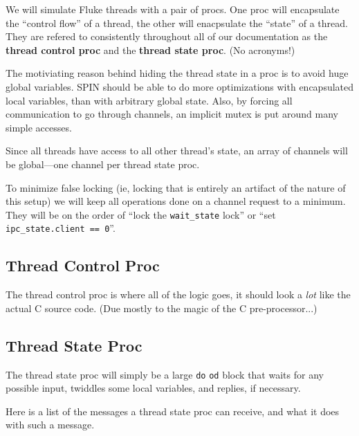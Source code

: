 We will simulate Fluke threads with a pair of procs.  One proc will
encapsulate the ``control flow'' of a thread, the other will enacpsulate
the ``state'' of a thread.  They are refered to consistently throughout
all of our documentation as the {\bf thread control proc} and the 
{\bf thread state proc}. (No acronyms!)

The motiviating reason behind hiding the thread state in a proc is to
avoid huge global variables.  SPIN should be able to do more
optimizations with encapsulated local variables, than with arbitrary
global state.
Also, by forcing
all communication to go through channels, an implicit mutex is put
around many simple accesses.  

Since all threads have access to all other thread's state, an array of
channels will be global---one channel per thread state proc. 

To minimize false locking (ie, locking that is entirely an artifact of
the nature of this setup) we will keep all operations done on a
channel request to a minimum.  They will be on the order of ``lock the
{\tt wait_state} lock'' or ``set {\tt ipc_state.client == 0}''.

\subsection{Thread Control Proc}

The thread control proc is where all of the logic goes, it should look
a {\em lot} like the actual C source code.  (Due mostly to the magic
of the C pre-processor...)

\subsection{Thread State Proc}

The thread state proc will simply be a large {\tt do} {\tt od} block
that waits for any possible input, twiddles some local variables, and
replies, if necessary.

Here is a list of the messages a thread state proc can receive, and
what it does with such a message.

